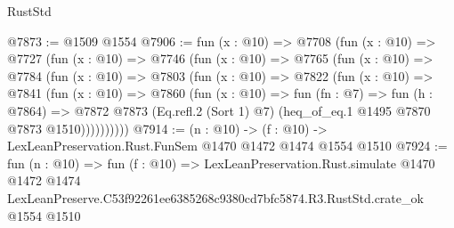 \begin{lexlean}{RustStd}
\begin{coremodule}
@7873 := @1509 @1554
@7906 := fun (x : @10) =>
  @7708
    (fun (x : @10) =>
    @7727
      (fun (x : @10) =>
      @7746
        (fun (x : @10) =>
        @7765
          (fun (x : @10) =>
          @7784
            (fun (x : @10) =>
            @7803
              (fun (x : @10) =>
              @7822
                (fun (x : @10) =>
                @7841
                  (fun (x : @10) =>
                  @7860
                    (fun (x : @10) =>
                    fun (fn : @7) =>
                    fun (h : @7864) =>
                    @7872
                      @7873
                      (Eq.refl.{2} (Sort 1) @7)
                      (heq_of_eq.{1} @1495 @7870 @7873 @1510))))))))))
@7914 := (n : @10) -> (f : @10) -> LexLeanPreservation.Rust.FunSem @1470 @1472 @1474 @1554 @1510
@7924 := fun (n : @10) =>
  fun (f : @10) =>
  LexLeanPreservation.Rust.simulate
    @1470
    @1472
    @1474
    LexLeanPreserve.C53f92261ee6385268c9380cd7bfc5874.R3.RustStd.crate_ok
    @1554
    @1510
\end{coremodule}
\end{lexlean}
